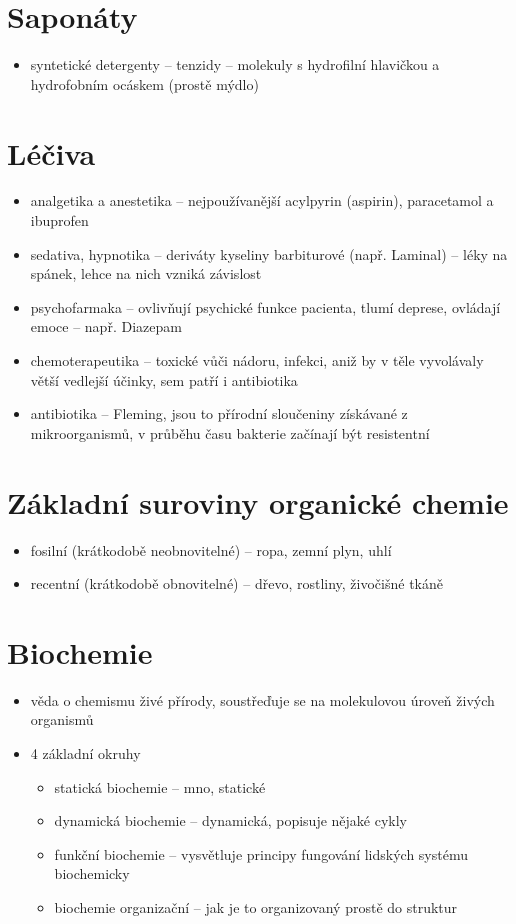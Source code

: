 \documentclass{article}
\begin{document}
\part{Saponáty}
\begin{itemize}
  \item syntetické detergenty -- tenzidy -- molekuly s hydrofilní hlavičkou a hydrofobním ocáskem (prostě mýdlo)
\end{itemize}

\part{Léčiva}
\begin{itemize}
  \item analgetika a anestetika -- nejpoužívanější acylpyrin (aspirin), paracetamol a ibuprofen
  \item sedativa, hypnotika -- deriváty kyseliny barbiturové (např. Laminal) -- léky na spánek, lehce na nich vzniká závislost
  \item psychofarmaka -- ovlivňují psychické funkce pacienta, tlumí deprese, ovládají emoce -- např. Diazepam
  \item chemoterapeutika -- toxické vůči nádoru, infekci, aniž by v těle vyvolávaly větší vedlejší účinky, sem patří i antibiotika
  \item antibiotika -- Fleming, jsou to přírodní sloučeniny získávané z mikroorganismů, v průběhu času bakterie začínají být resistentní
\end{itemize}

\part{Základní suroviny organické chemie}
\begin{itemize}
  \item fosilní (krátkodobě neobnovitelné) -- ropa, zemní plyn, uhlí
  \item recentní (krátkodobě obnovitelné) -- dřevo, rostliny, živočišné tkáně
\end{itemize}

\part{Biochemie}
\begin{itemize}
  \item věda o chemismu živé přírody, soustřeďuje se na molekulovou úroveň živých organismů
  \item 4 základní okruhy
  \begin{itemize}
    \item statická biochemie -- mno, statické
    \item dynamická biochemie -- dynamická, popisuje nějaké cykly
    \item funkční biochemie -- vysvětluje principy fungování lidských systému biochemicky
    \item biochemie organizační -- jak je to organizovaný prostě do struktur
  \end{itemize}
\end{itemize}
\end{document}
